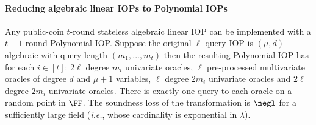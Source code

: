 \paragraph{Reducing algebraic linear IOPs to Polynomial IOPs} 
\label{sec:algebraicIOP}

\begin{theorem}\label{thm:algebraicIOPcompiler}
Any public-coin $t$-round stateless algebraic linear IOP can be implemented with a $t+1$-round Polynomial IOP. Suppose the original $\ell$-query IOP is $(\mu,d)$ algebraic with query length $(m_1,...,m_t)$ then the resulting Polynomial IOP has for each $i \in [t]$: $2\ell$ degree $m_i$ univariate oracles, $\ell$ pre-processed multivariate oracles of degree $d$ and $\mu+1$ variables, $\ell$ degree $2m_i$ univariate oracles %
and $2\ell$ degree $2m_i$ univariate oracles. %
There is exactly one query to each oracle on a random point in $\FF$. The soundness loss of the transformation is $\negl$ for a sufficiently large field (\emph{i.e.}, whose cardinality is exponential in $\lambda$).
\end{theorem}

